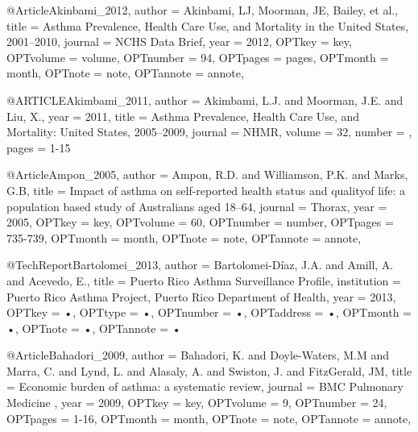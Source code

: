 @Article{Akinbami_2012,
author = {Akinbami, LJ, Moorman, JE, Bailey, et al.},
title = {Asthma Prevalence, Health Care Use, and Mortality in the United States, 2001–2010},
journal = {NCHS Data Brief},
year = {2012},
OPTkey = {key},
OPTvolume = {volume},
OPTnumber = {94},
OPTpages = {pages},
OPTmonth = {month},
OPTnote = {note},
OPTannote = {annote},
}


@ARTICLE{Akimbami_2011,
  author = {Akimbami, L.J. and Moorman, J.E. and Liu, X.},
  year = {2011},
  title = {Asthma Prevalence, Health Care Use, and Mortality: United States, 2005–2009},
  journal = NHMR,
  volume =  {32},
  number = {},
  pages = {1-15}
}

@Article{Ampon_2005,
author = {Ampon, R.D. and Williamson, P.K. and Marks, G.B},
title = {Impact of asthma on self-reported health status and qualityof life: a population based study of Australians aged 18–64},
journal = {Thorax},
year = {2005},
OPTkey = {key},
OPTvolume = {60},
OPTnumber = {number},
OPTpages = {735-739},
OPTmonth = {month},
OPTnote = {note},
OPTannote = {annote},
}


@TechReport{Bartolomei_2013,
author = {Bartolomei-Díaz, J.A. and Amill, A. and Acevedo, E.},
title = {Puerto Rico Asthma Surveillance Profile},
institution = {Puerto Rico Asthma Project, Puerto Rico Department of Health},
year = {2013},
OPTkey = {•},
OPTtype = {•},
OPTnumber = {•},
OPTaddress = {•},
OPTmonth = {•},
OPTnote = {•},
OPTannote = {•}
}

@Article{Bahadori_2009,
author = {Bahadori, K. and Doyle-Waters, M.M and Marra, C. and Lynd, L. and Alasaly, A. and Swiston, J. and FitzGerald, JM},
title = {Economic burden of asthma: a systematic review},
journal = {BMC Pulmonary Medicine },
year = {2009},
OPTkey = {key},
OPTvolume = {9},
OPTnumber = {24},
OPTpages = {1-16},
OPTmonth = {month},
OPTnote = {note},
OPTannote = {annote},
}

